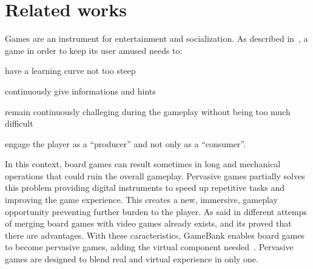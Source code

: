 \section{Related works}

Games are an instrument for entertainment and socialization. As described 
in~\cite{gee03}, a game in order to keep its user amused needs to:
\begin{enumerate*}[label=\roman*)]
 \item have a learning curve not too steep
 \item continuously give informations and hints
 \item remain continuously challeging during the gameplay without being too much
difficult
 \item engage the player as a ``producer'' and not only as a ``consumer''.
\end{enumerate*}
In this context, board games can result sometimes in long and mechanical 
operations that could ruin the overall gameplay. Pervasive games partially 
solves this problem providing digital instruments to speed up repetitive 
tasks and improving the game experience. This creates a new, immersive, 
gameplay opportunity preventing further burden to the player.
As said in\cite{mandryk02} different attemps of merging board games with video 
games already exists, and its proved that there are advantages.
With these caracteristics, GameBank enables board games to become pervasive 
games, adding the virtual component needed~\cite{arango17}. Pervasive games are 
designed to blend real and virtual experience in only one.